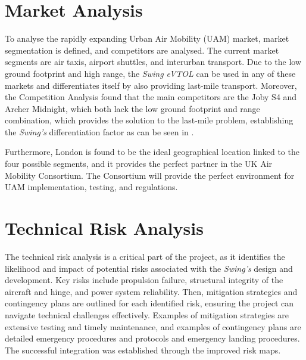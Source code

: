 \section*{Market Analysis}
To analyse the rapidly expanding Urban Air Mobility (UAM) market, market segmentation is defined, and competitors are analysed. The current market segments are air taxis,  airport shuttles, and interurban transport. Due to the low ground footprint and high range, the \textit{Swing eVTOL} can be used in any of these markets and differentiates itself by also providing last-mile transport.
Moreover, the Competition Analysis found that the main competitors are the Joby S4 and Archer Midnight, which both lack the low ground footprint and range combination, which provides the solution to the last-mile problem, establishing the \textit{Swing's} differentiation factor as can be seen in . 

\begin{table}[H]
    \centering
    \caption{Differentiation of \textit{Swing eVTOL} in market segments}
    \label{tab_exe:possible_usecases}
\end{table}
Furthermore, London is found to be the ideal geographical location linked to the four possible segments, and it provides the perfect partner in the UK Air Mobility Consortium. The Consortium will provide the perfect environment for UAM implementation, testing, and regulations.


\section*{Technical Risk Analysis}
The technical risk analysis is a critical part of the project, as it identifies the likelihood and impact of potential risks associated with the \textit{Swing's} design and development.
Key risks include propulsion failure, structural integrity of the aircraft and hinge, and power system reliability.
Then, mitigation strategies and contingency plans are outlined for each identified risk, ensuring the project can navigate technical challenges effectively.
Examples of mitigation strategies are extensive testing and timely maintenance, and examples of contingency plans are detailed emergency procedures and protocols and emergency landing procedures.
The successful integration was established through the improved risk maps.



